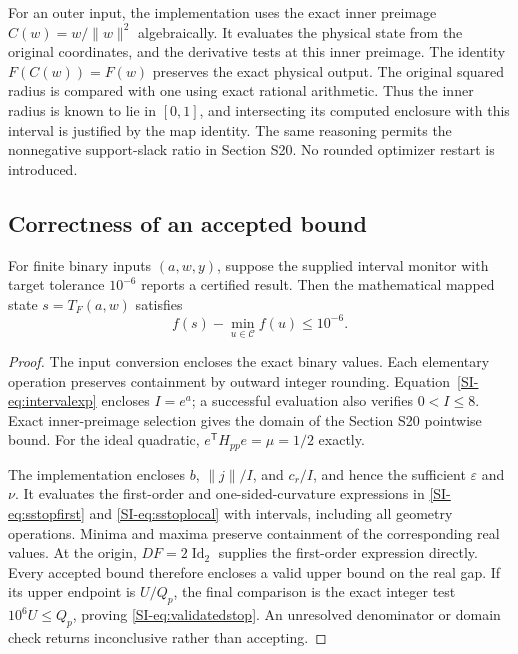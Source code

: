 For an outer input, the implementation uses the exact inner preimage $C(w)=w/\|w\|^2$ algebraically. It evaluates the physical state from the original coordinates, and the derivative tests at this inner preimage. The identity $F(C(w))=F(w)$ preserves the exact physical output. The original squared radius is compared with one using exact rational arithmetic. Thus the inner radius is known to lie in $[0,1]$, and intersecting its computed enclosure with this interval is justified by the map identity. The same reasoning permits the nonnegative support-slack ratio in Section S20. No rounded optimizer restart is introduced.

\subsection{Correctness of an accepted bound}
\begin{proposition}
\label{SI-prop:validatedstop}
For finite binary inputs $(a,w,y)$, suppose the supplied interval monitor with target tolerance $10^{-6}$ reports a certified result. Then the mathematical mapped state $s=T_F(a,w)$ satisfies
\begin{equation}
 f(s)-\min_{u\in\mathcal C}f(u)\le10^{-6}.
 \label{SI-eq:validatedstop}
\end{equation}
\end{proposition}
\begin{proof}
The input conversion encloses the exact binary values. Each elementary operation preserves containment by outward integer rounding. Equation~\eqref{SI-eq:intervalexp} encloses $I=e^a$; a successful evaluation also verifies $0<I\le8$. Exact inner-preimage selection gives the domain of the Section S20 pointwise bound. For the ideal quadratic, $e^{\mathsf T}H_{pp}e=\mu=1/2$ exactly.

The implementation encloses $b$, $\|j\|/I$, and $c_r/I$, and hence the sufficient $\varepsilon$ and $\nu$. It evaluates the first-order and one-sided-curvature expressions in \eqref{SI-eq:sstopfirst} and \eqref{SI-eq:sstoplocal} with intervals, including all geometry operations. Minima and maxima preserve containment of the corresponding real values. At the origin, $DF=2\operatorname{Id}_2$ supplies the first-order expression directly. Every accepted bound therefore encloses a valid upper bound on the real gap. If its upper endpoint is $U/Q_p$, the final comparison is the exact integer test $10^6U\le Q_p$, proving \eqref{SI-eq:validatedstop}. An unresolved denominator or domain check returns inconclusive rather than accepting.
\end{proof}


